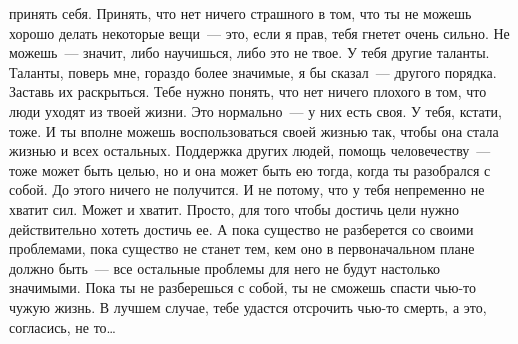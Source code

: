 принять себя. Принять, что нет ничего страшного в том, что ты не можешь хорошо 
делать некоторые вещи~--- это, если я прав, тебя гнетет очень сильно. Не 
можешь~--- 
значит, либо научишься, либо это не твое. У тебя другие таланты. Таланты, 
поверь 
мне, гораздо более значимые, я бы сказал~--- другого порядка. Заставь их 
раскрыться. Тебе нужно понять, что нет ничего плохого в том, что люди уходят из 
твоей жизни. Это нормально~--- у них есть своя. У тебя, кстати, тоже. И ты 
вполне 
можешь воспользоваться своей жизнью так, чтобы она стала жизнью и всех 
остальных. Поддержка других людей, помощь человечеству~--- тоже может быть 
целью, 
но и она может быть ею тогда, когда ты разобрался с собой. До этого ничего не 
получится. И не потому, что у тебя непременно не хватит сил. Может и хватит. 
Просто, для того чтобы достичь цели нужно действительно хотеть достичь ее. А 
пока существо не разберется со своими проблемами, пока существо не станет тем, 
кем оно в первоначальном плане должно быть~--- все остальные проблемы для него 
не 
будут настолько значимыми. Пока ты не разберешься с собой, ты не сможешь спасти 
чью-то чужую жизнь. В лучшем случае, тебе удастся отсрочить чью-то смерть, а 
это, согласись, не то\ldots


